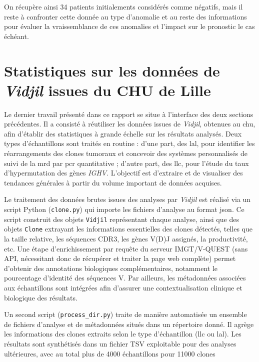 On récupère ainsi 34 patients initialements considérés comme négatifs, mais il reste 
à confronter cette donnée au type d'anomalie et au reste des informations pour évaluer la 
vraissemblance de ces anomalies et l'impact sur le pronostic le cas échéant.

\section{Statistiques sur les données de \textit{Vidjil} issues du CHU de Lille}

Le dernier travail présenté dans ce rapport se situe à l'interface des deux
sections précédentes. Il a consisté à réutiliser les données issues de
\textit{Vidjil}, obtenues au \gls{chu}, afin d'établir des statistiques à
grande échelle sur les résultats analysés. Deux types d'échantillons sont
traités en routine : d'une part, des \gls{lal}, pour identifier les
réarrangements des clones tumoraux et concevoir des systèmes personnalisés de
suivi de la \gls{mrd} par \gls{pcr} quantitative ; d'autre part, des
\gls{llc}, pour l'étude du taux d'hypermutation des gènes \textit{IGHV}.
L'objectif est d'extraire et de visualiser des tendances générales à partir du
volume important de données acquises.

Le traitement des données brutes issues des analyses par \textit{Vidjil} est
réalisé via un script Python (\texttt{clone.py}) qui importe les fichiers
d'analyse au format \gls{json}. Ce script construit des objets \texttt{Vidjil}
représentant chaque analyse, ainsi que des objets \texttt{Clone} extrayant les
informations essentielles des clones détectés, telles que la taille relative,
les séquences CDR3, les gènes V(D)J assignés, la productivité, etc. Une étape
d'enrichissement par requête du serveur IMGT/V-QUEST (sans API, nécessitant
donc de récupérer et traiter la page web complète) permet d'obtenir des
annotations biologiques complémentaires, notamment le pourcentage d'identité
des séquences V. Par ailleurs, les métadonnées associées aux échantillons sont
intégrées afin d'assurer une contextualisation clinique et biologique des
résultats.

Un second script (\texttt{process\_dir.py}) traite de manière automatisée un
ensemble de fichiers d'analyse et de métadonnées situés dans un répertoire
donné. Il agrège les informations des clones extraits selon le type
d'échantillon (\gls{llc} ou \gls{lal}). Les résultats sont synthétisés dans un
fichier TSV exploitable pour des analyses ultérieures, avec au total plus de
4000 échantillons pour 11000 clones

